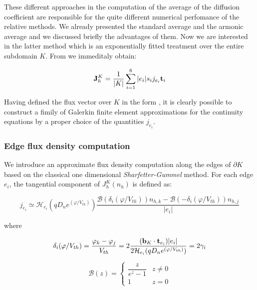These different approaches in the computation of the average of the diffusion coefficient are responsible for the quite different numerical perfomance of the relative methods.
We already presented the standard average and the armonic average and we discussed briefly the advantages of them. 
Now we are interested in the latter method which  is an exponentially fitted treatment over the entire subdomain $K$. 
From  we immeditaly obtain:

\begin{equation}
\label{eq: exp fitted flux}
\mathbf{J}_h^K = \dfrac{1}{|K|}\sum_{i=1}^6 |e_i| s_i j_{e_i} \mathbf{t}_i 
\end{equation}

Having defined the flux vector over $K$ in the form , it is clearly possible to construct a fimily of Galerkin finite element approximations for the continuity equations by a proper choice of the quantities $j_{e_i}$. 

\subsubsection{Edge flux density computation}

We introduce an approximate flux density computation along the edges of $\partial K$ based on the classical one dimensional \textit{Sharfetter-Gummel} method. For each edge $e_i$, the tangential component of $J_h^K(n_h)$ is defined as:

\begin{equation}
j_{e_i}  \simeq \mathcal{H}_{e_i}(qD_n e^{(\varphi/V_{th})}) \dfrac{\mathcal{B}(\delta_i(\varphi / V_{th}))n_{h,k} -  \mathcal{B}(-\delta_i(\varphi / V_{th}))n_{h,j}}{|e_i|}
\end{equation}

where 

\begin{equation}
\delta_i(\varphi / V_{th}) = \dfrac{\varphi_k - \varphi_j}{V_{th}} = 2 \dfrac{(\mathbf{b}_K\cdot \mathbf{t}_{e_i}) |e_i|}{2\mathcal{H}_{e_i}(qD_n e^{(\varphi/V_{th})}) } = 2 \gamma_i
\end{equation}

\begin{equation}
\mathcal{B}(z) = \left\{ \begin{array}{cl}
\dfrac{z}{e^z-1} & z \neq 0
\\
1 & z = 0
\end{array}
\right.
\end{equation}


